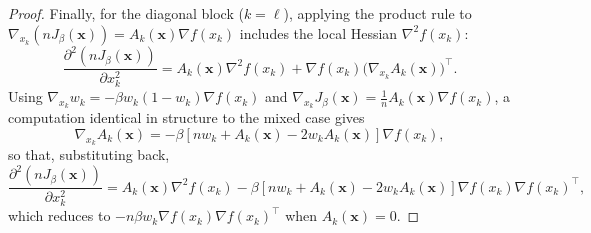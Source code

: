 \documentclass{article} %
\theoremstyle{plain}
\theoremstyle{definition}
\theoremstyle{remark}
\newcommand{\prefactor}[2]{A_{#1}(#2)}
\newcommand{\xx}{\mathbf{x}}
\begin{document}
\begin{proof}
    Finally, for the diagonal block ($k=\ell$), applying the product rule to $\nabla_{x_k}(nJ_\beta(\xx))=\prefactor{k}{\xx}\nabla f(x_k)$ includes the local Hessian $\nabla^2 f(x_k)$:
    \[
        \frac{\partial^2(nJ_\beta(\xx))}{\partial x_k^2} = \prefactor{k}{\xx}\nabla^2f(x_k) + \nabla f(x_k)\bigl(\nabla_{x_k}\prefactor{k}{\xx}\bigr)^\top.
    \]
    Using $\nabla_{x_k}w_k=-\beta w_k(1-w_k)\nabla f(x_k)$ and $\nabla_{x_k}J_\beta(\xx)=\frac1n\prefactor{k}{\xx}\nabla f(x_k)$, a computation identical in structure to the mixed case gives
    \[
        \nabla_{x_k}\prefactor{k}{\xx} = -\beta\left[nw_k+\prefactor{k}{\xx}-2w_k\prefactor{k}{\xx}\right]\nabla f(x_k),
    \]
    so that, substituting back,
    \[
        \frac{\partial^2(nJ_\beta(\xx))}{\partial x_k^2} = \prefactor{k}{\xx}\nabla^2f(x_k) - \beta\left[nw_k+\prefactor{k}{\xx}-2w_k\prefactor{k}{\xx}\right]\nabla f(x_k)\nabla f(x_k)^\top,
    \]
    which reduces to $-n\beta w_k\nabla f(x_k)\nabla f(x_k)^\top$ when $\prefactor{k}{\xx}=0$. \qedhere
\end{proof}
\end{document}
